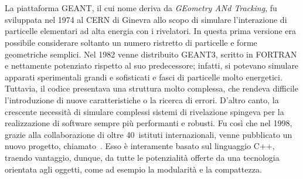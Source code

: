
\section{}


La piattaforma GEANT, il cui nome deriva da \emph{GEometry ANd Tracking}, fu sviluppata nel 1974 al CERN di Ginevra allo scopo di simulare l'interazione di particelle elementari ad alta energia con i rivelatori.
In questa prima versione era possibile considerare soltanto un numero ristretto di particelle e forme geometriche semplici. 
Nel 1982 venne distribuito GEANT3, scritto in FORTRAN e nettamente potenziato rispetto al suo predecessore; infatti, si potevano simulare apparati sperimentali grandi e sofisticati e fasci di particelle molto energetici.
Tuttavia, il codice presentava una struttura molto complessa, che rendeva difficile l'introduzione di nuove caratteristiche o la ricerca di errori.
%
D'altro canto, la crescente necessità di simulare complessi sistemi di rivelazione spingeva per la realizzazione di software sempre più performanti e robusti.
Fu così che nel 1998, grazie alla collaborazione di oltre 40~istituti internazionali, venne pubblicato un nuovo progetto, chiamato~\geant.
Esso è interamente basato sul linguaggio C++, traendo vantaggio, dunque, da tutte le potenzialità offerte da una tecnologia orientata agli oggetti, come ad esempio la modularità e la compattezza.

